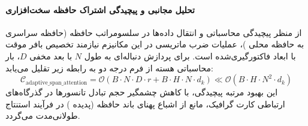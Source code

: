 \paragraph{تحلیل مجانبی و پیچیدگی اشتراک حافظه سخت‌افزاری}
از منظر پیچیدگی محاسباتی و انتقال داده‌ها در سلسومراتب حافظه (حافظه سراسری  به حافظه محلی )، عملیات ضرب ماتریسی در این مکانیزم نیازمند تخصیص بافر موقت با ابعاد فاکتورگیری‌شده است. برای پردازش دنباله‌ای به طول $N$ با بعد مخفی $D$، بار محاسباتی هسته از فرم درجه دو به رابطه زیر تقلیل می‌یابد:
\begin{equation}
\label{eq:complexity_adaptive_span_attention}
\mathcal{C}_{\text{adaptive\_span\_attention}} = \mathcal{O}\left( B \cdot N \cdot D \cdot r + B \cdot H \cdot N \cdot d_k \right) \ll \mathcal{O}\left( B \cdot H \cdot N^2 \cdot d_k \right)
\end{equation}
این بهبود مرتبه پیچیدگی، با کاهش چشمگیر حجم تبادل تانسورها در گذرگاه‌های ارتباطی کارت گرافیک، مانع از اشباع پهنای باند حافظه (پدیده ) در فرآیند استنتاج طولانی‌مدت می‌گردد.